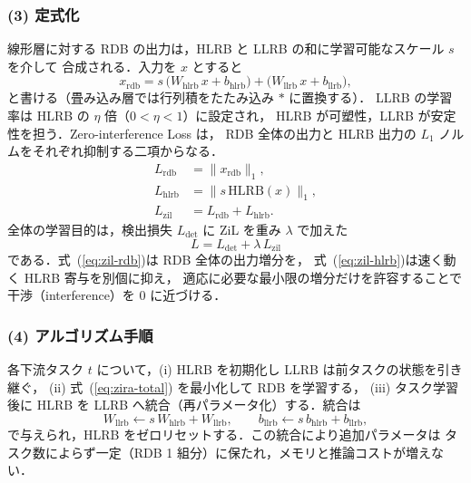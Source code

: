 \subsubsection*{(3) 定式化}
線形層に対する RDB の出力は，HLRB と LLRB の和に学習可能なスケール $s$ を介して
合成される．入力を $x$ とすると
\begin{equation}
x_{\mathrm{rdb}} = s\,\bigl(W_{\mathrm{hlrb}}\,x + b_{\mathrm{hlrb}}\bigr)
  + \bigl(W_{\mathrm{llrb}}\,x + b_{\mathrm{llrb}}\bigr),
\label{eq:rdb}
\end{equation}
と書ける（畳み込み層では行列積をたたみ込み $\ast$ に置換する）．
LLRB の学習率は HLRB の $\eta$ 倍（$0<\eta<1$）に設定され，
HLRB が可塑性，LLRB が安定性を担う．Zero-interference Loss は，
RDB 全体の出力と HLRB 出力の $L_1$ ノルムをそれぞれ抑制する二項からなる．
\begin{align}
L_{\mathrm{rdb}}  &= \bigl\| x_{\mathrm{rdb}} \bigr\|_1, \label{eq:zil-rdb}\\
L_{\mathrm{hlrb}} &= \bigl\| s\,\mathrm{HLRB}(x) \bigr\|_1, \label{eq:zil-hlrb}\\
L_{\mathrm{zil}}  &= L_{\mathrm{rdb}} + L_{\mathrm{hlrb}}. \label{eq:zil}
\end{align}
全体の学習目的は，検出損失 $L_{\mathrm{det}}$ に ZiL を重み $\lambda$ で加えた
\begin{equation}
L = L_{\mathrm{det}} + \lambda\,L_{\mathrm{zil}}
\label{eq:zira-total}
\end{equation}
である．式~(\ref{eq:zil-rdb})は RDB 全体の出力増分を，
式~(\ref{eq:zil-hlrb})は速く動く HLRB 寄与を別個に抑え，
適応に必要な最小限の増分だけを許容することで干渉（interference）を 0 に近づける．

\subsubsection*{(4) アルゴリズム手順}
各下流タスク $t$ について，(i) HLRB を初期化し LLRB は前タスクの状態を引き継ぐ，
(ii) 式~(\ref{eq:zira-total}) を最小化して RDB を学習する，
(iii) タスク学習後に HLRB を LLRB へ統合（再パラメータ化）する．統合は
\begin{equation}
W_{\mathrm{llrb}} \leftarrow s\,W_{\mathrm{hlrb}} + W_{\mathrm{llrb}},\qquad
b_{\mathrm{llrb}} \leftarrow s\,b_{\mathrm{hlrb}} + b_{\mathrm{llrb}},
\label{eq:rdb-merge}
\end{equation}
で与えられ，HLRB をゼロリセットする．この統合により追加パラメータは
タスク数によらず一定（RDB 1 組分）に保たれ，メモリと推論コストが増えない．


